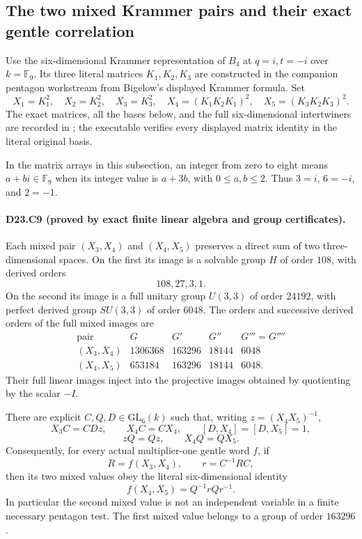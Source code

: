 
\subsection{The two mixed Krammer pairs and their exact gentle correlation}

Use the six-dimensional Krammer representation of $B_4$ at
$q=i,t=-i$ over $k=\mathbb F_9$.  Its three literal matrices
$K_1,K_2,K_3$ are constructed in the companion pentagon workstream
from Bigelow's displayed Krammer formula.  Set
\[
 X_1=K_1^2,\quad X_2=K_2^2,\quad X_3=K_3^2,
 \quad X_4=(K_1K_2K_1)^2,\quad X_5=(K_3K_2K_3)^2.
\]
The exact matrices, all the bases below, and the full six-dimensional
intertwiners are recorded in
; the executable
 verifies every
displayed matrix identity in the literal original basis.

In the matrix arrays in this subsection, an integer from zero to
eight means $a+bi\in\mathbb F_9$ when its integer value is $a+3b$,
with $0\le a,b\le2$.  Thus $3=i$, $6=-i$, and $2=-1$.

\paragraph{D23.C9 (proved by exact finite linear algebra and group certificates).}
Each mixed pair $(X_3,X_4)$ and $(X_4,X_5)$ preserves a direct
sum of two three-dimensional spaces.  On the first its image is
a solvable group $H$ of order $108$, with derived orders
\[
 108,27,3,1.
\]
On the second its image is a full unitary group $U(3,3)$ of order
$24192$, with perfect derived group $SU(3,3)$ of order $6048$.
The orders and successive derived orders of the full mixed images are
\[
\begin{array}{c|rrrr}
 \text{pair}&G&G'&G''&G'''=G''''\\\hline
 (X_3,X_4)&1306368&163296&18144&6048\\
 (X_4,X_5)&653184&163296&18144&6048.
\end{array}
\]
Their full linear images inject into the projective images obtained
by quotienting by the scalar $-I$.

There are explicit $C,Q,D\in\mathrm{GL}_6(k)$ such that, writing
$z=(X_4X_5)^{-1}$,
\[
 X_3C=CDz,\qquad X_4C=CX_4,\qquad
 [D,X_4]=[D,X_5]=1,
\]
\[
 zQ=Qz,\qquad X_4Q=QX_5.
\]
Consequently, for every actual multiplier-one gentle word $f$, if
\[
 R=f(X_3,X_4),\qquad r=C^{-1}RC,
\]
then its two mixed values obey the literal six-dimensional identity
\[
 \boxed{f(X_4,X_5)=Q^{-1}rQr^{-1}.}
\]
In particular the second mixed value is not an independent variable
in a finite necessary pentagon test.  The first mixed value belongs
to a group of order $163296$.

